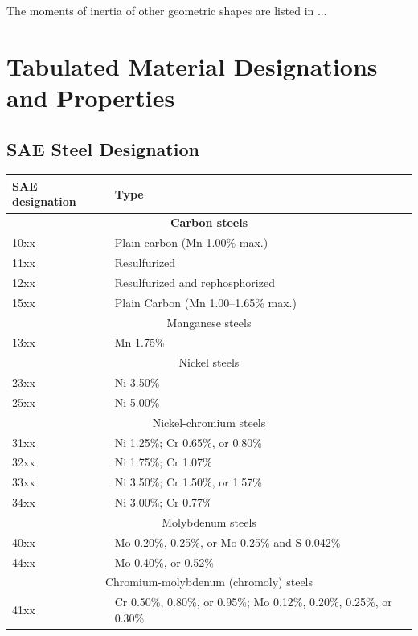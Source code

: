 \documentclass[
10pt,
a4paper,
openany,
svgnames,
]{book}
\begin{document}
The moments of inertia of other geometric shapes are listed in ...

\begin{table}
\end{table}

\chapter{Tabulated Material Designations and Properties}

\section{SAE Steel Designation}

\begin{table}[h] 
  \centering
  \begin{tabular}{ll}
    \toprule
    SAE designation & Type \\
    \midrule
    \multicolumn{2}{c}{\textbf{Carbon steels}}  \\
    10xx & Plain carbon (Mn 1.00\% max.) \\
    11xx & Resulfurized \\
    12xx & Resulfurized and rephosphorized \\
    15xx & Plain Carbon (Mn 1.00–1.65\% max.) \\
    \multicolumn{2}{c}{Manganese steels}  \\
    13xx & Mn 1.75\% \\
    \multicolumn{2}{c}{Nickel steels} \\
    23xx & Ni 3.50\% \\
    25xx & Ni 5.00\% \\
    \multicolumn{2}{c}{Nickel-chromium steels} \\
    31xx & Ni 1.25\%; Cr 0.65\%, or 0.80\% \\
    32xx & Ni 1.75\%; Cr 1.07\% \\
    33xx & Ni 3.50\%; Cr 1.50\%, or 1.57\% \\
    34xx & Ni 3.00\%; Cr 0.77\% \\
    \multicolumn{2}{c}{Molybdenum steels} \\
    40xx & Mo 0.20\%, 0.25\%, or Mo 0.25\% and S 0.042\% \cite{bringas2004handbook} \\
    44xx & Mo 0.40\%, or 0.52\% \\
    \multicolumn{2}{c}{Chromium-molybdenum (chromoly) steels} \\
    41xx & Cr 0.50\%, 0.80\%, or 0.95\%; Mo 0.12\%, 0.20\%, 0.25\%, or 0.30\% \\

\end{tabular}
\end{table}
\end{document}
